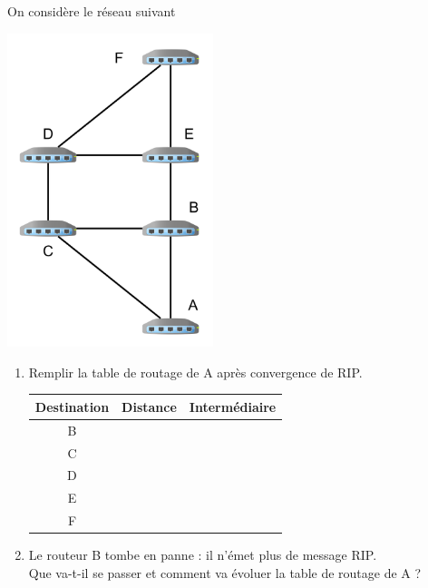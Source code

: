 \documentclass[a4paper,12pt,french]{article}
\begin{document}
\begin{exercice}
	On considère le réseau suivant
	\begin{center}
		\includegraphics[width=6cm]{img/res2.png}
	\end{center}

\newpage 

\begin{enumerate}
	\item Remplir la table de routage de A après convergence de RIP.
\begin{center}
\begin{tabular}{|c|c|c|}
	\hline
\rowcolor{UGLiOrange}	\textbf{\color{white}Destination} & \textbf{\color{white}Distance} & \textbf{\color{white}Intermédiaire} \\	\hline
	B &  &  \\
	\hline
	C &  &  \\
	\hline
	D &  &  \\
	\hline
	E &  &  \\
	\hline
	F &  &  \\
	\hline
\end{tabular}

\end{center}
	\item Le routeur B tombe en panne : il n'émet plus de message RIP.\\
Que va-t-il se passer et comment va évoluer la table de routage de A ?
\end{enumerate}
\end{exercice}
\end{document}
